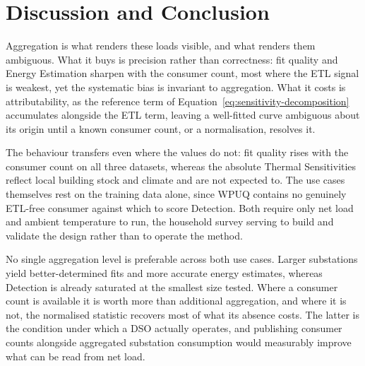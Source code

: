 \documentclass[9pt,journal,a4]{IEEEtran}
\begin{document}
\section{Discussion and Conclusion}
\label{section:discussion}

Aggregation is what renders these loads visible, and what renders them ambiguous. What it buys is precision rather than correctness: fit quality and Energy Estimation sharpen with the consumer count, most where the ETL signal is weakest, yet the systematic bias is invariant to aggregation. What it costs is attributability, as the reference term of Equation~\eqref{eq:sensitivity-decomposition} accumulates alongside the ETL term, leaving a well-fitted curve ambiguous about its origin until a known consumer count, or a normalisation, resolves it.

The behaviour transfers even where the values do not: fit quality rises with the consumer count on all three datasets, whereas the absolute Thermal Sensitivities reflect local building stock and climate and are not expected to. The use cases themselves rest on the training data alone, since WPUQ contains no genuinely ETL-free consumer against which to score Detection. Both require only net load and ambient temperature to run, the household survey serving to build and validate the design rather than to operate the method.

No single aggregation level is preferable across both use cases. Larger substations yield better-determined fits and more accurate energy estimates, whereas Detection is already saturated at the smallest size tested. Where a consumer count is available it is worth more than additional aggregation, and where it is not, the normalised statistic recovers most of what its absence costs. The latter is the condition under which a DSO actually operates, and publishing consumer counts alongside aggregated substation consumption would measurably improve what can be read from net load.




\end{document}
